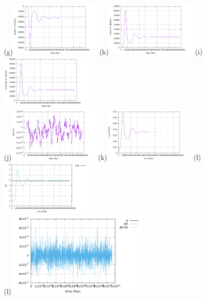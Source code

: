 \begin{center}
(g)\includegraphics[width=4.5cm]{python_codes/fieldstone_24/BA_104/adiabatic_heating}
(h)\includegraphics[width=4.5cm]{python_codes/fieldstone_24/BA_104/viscous_dissipation}
(i)\includegraphics[width=4.5cm]{python_codes/fieldstone_24/BA_104/work_grav}\\
(j)\includegraphics[width=4.5cm]{python_codes/fieldstone_24/BA_104/heat_flux}
(k)\includegraphics[width=4.5cm]{python_codes/fieldstone_24/BA_104/vrms}
(l)\includegraphics[width=4.5cm]{python_codes/fieldstone_24/BA_104/Nu}\\
(l)\includegraphics[width=7cm]{python_codes/fieldstone_24/BA_104/conservation1}

\end{center}
